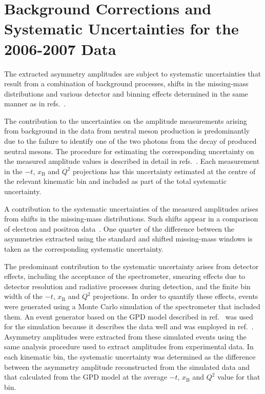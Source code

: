 \section{Background Corrections and Systematic Uncertainties for the
  2006-2007 Data}
The extracted asymmetry amplitudes are subject to systematic uncertainties that
result from a combination of background processes, 
shifts in the missing-mass distributions and various detector and binning
effects determined in the same manner as in refs.~\cite{Air08,Air09}.

The contribution to the uncertainties on the amplitude measurements
arising from background in the data from neutral meson
production is predominantly due to the failure to identify one of
  the two photons from the decay of produced neutral mesons. The procedure for estimating the corresponding
uncertainty on the measured amplitude values is described in detail in
refs.~\cite{Air08,Air09}. Each measurement in the $-t$, $x_{\textrm{B}}$ and
  $Q^{2}$ projections has this uncertainty estimated at the
  centre of the relevant kinematic bin and included as part of the
  total systematic uncertainty.

A contribution to the systematic uncertainties of the
  measured amplitudes arises from shifts in  the
missing-mass distributions. Such shifts appear in a comparison of electron and positron data~\cite{Zei09,Bur10}. One
quarter of the difference between the asymmetries extracted using the standard
and shifted missing-mass windows is taken as the corresponding systematic
uncertainty. 

The predominant contribution to the systematic uncertainty arises from detector
effects, including the acceptance of the spectrometer, smearing
effects due to detector resolution and radiative processes during
  detection, and
the finite bin width of the $-t$, $x_{\textrm{B}}$ and $Q^{2}$ projections. In order to quantify these effects, events were generated using a Monte Carlo simulation of the spectrometer that included them. An event
generator based on the GPD model described in ref.~\cite{Van99,Goe01} was
used for the simulation because it describes the data well and was employed in ref.~\cite{Air09}. Asymmetry amplitudes were extracted
from these simulated events using the same analysis procedure used to
extract amplitudes from experimental data. In each kinematic bin, the
systematic uncertainty was determined as the difference between the asymmetry amplitude reconstructed from the simulated data and that
calculated from the GPD model at the average $-t$, $x_{\textrm{B}}$ and
$Q^{2}$ value for that bin.

